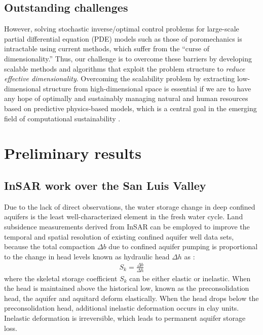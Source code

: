 \documentclass[11pt,final]{article}%
\renewcommand{\citep}{\cite}
\begin{document}
\subsection{Outstanding challenges}\label{sec:challenges}
However, solving stochastic inverse/optimal control problems for large-scale partial differential equation (PDE) models such as those of poromechanics is intractable using current methods, which suffer from the ``curse of dimensionality.''  Thus, our challenge is to overcome these barriers by developing scalable methods and algorithms that exploit the problem structure to {\em reduce effective dimensionality}. Overcoming the scalability problem by extracting low-dimensional structure from high-dimensional space is essential if we are to have any hope of optimally and sustainably managing natural and human resources based on predictive physics-based models, which is a central goal in the emerging field of computational
sustainability \cite{NRC2012}.


\section{Preliminary results}\label{sec:previous}
\subsection{InSAR work over the San Luis Valley}
Due to the lack of direct observations, the water storage change in deep confined aquifers is the least well-characterized element in the fresh water cycle. Land subsidence measurements derived from InSAR can be employed to improve the temporal and spatial resolution of existing confined aquifer well data sets, because the total compaction $\Delta b$ due to confined aquifer pumping is proportional to the change in head levels known as hydraulic head $\Delta h$ as \citep[e.g.,][]{galloway2011}:
\begin{align}
  S_{k} = \frac{\Delta b}{\Delta h}
\label{eq:elastic}  
\end{align}
where the skeletal storage coefficient $S_{k}$ can be either elastic or inelastic. When the head is maintained above the historical low, known as the preconsolidation head, the aquifer and aquitard deform elastically. When the head drops below the preconsolidation head, additional inelastic deformation occurs in clay units. Inelastic deformation is irreversible, which leads to permanent aquifer storage loss. 
\end{document}
